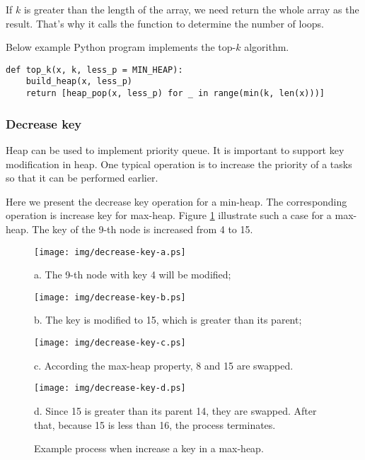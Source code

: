 \documentclass{article}
\begin{document}
If $k$ is greater than the length of the array,
we need return the whole array as the result. That's why it calls
the  function to determine the number of loops.

Below example Python program implements the top-$k$ algorithm.

\lstset{language=Python}
\begin{lstlisting}
def top_k(x, k, less_p = MIN_HEAP):
    build_heap(x, less_p)
    return [heap_pop(x, less_p) for _ in range(min(k, len(x)))]
\end{lstlisting}

\subsubsection{Decrease key}

Heap can be used to implement priority queue. It
is important to support key modification in heap. One typical operation
is to increase the priority of a tasks so that it can be performed
earlier.

Here we present the decrease key operation for a min-heap. The
corresponding operation is increase key for max-heap.
Figure \ref{fig:decrease-key} illustrate such a case for a max-heap.
The key of the 9-th node is increased from 4 to 15.

\begin{figure}[htbp]
  \begin{center}
    \texttt{[image: img/decrease-key-a.ps]}

    a. The 9-th node with key 4 will be modified;

    \texttt{[image: img/decrease-key-b.ps]}

    b. The key is modified to 15, which is greater than its parent;

    \texttt{[image: img/decrease-key-c.ps]}

    c. According the max-heap property, 8 and 15 are swapped.

    \texttt{[image: img/decrease-key-d.ps]}

    d. Since 15 is greater than its parent 14, they are swapped. After that, because 15 is less than 16, the process terminates.

    \caption{Example process when increase a key in a max-heap.} \label{fig:decrease-key}
  \end{center}
\end{figure}
\end{document}
